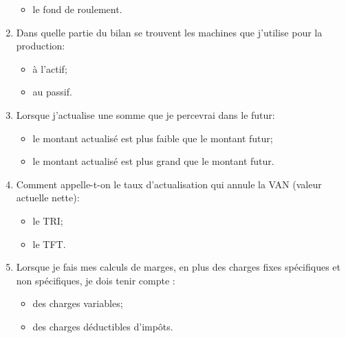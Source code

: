 \begin{enumerate}
\begin{itemize}
     \item le fond de roulement.
    \end{itemize}
  \item Dans quelle partie du bilan se trouvent les machines que j'utilise pour la production:
    \begin{itemize}
     \item à l'actif;
     \item au passif.
    \end{itemize}
  \item Lorsque j'actualise une somme que je percevrai dans le futur:
    \begin{itemize}
     \item le montant actualisé est plus faible que le montant futur;
     \item le montant actualisé est plus grand que le montant futur.
    \end{itemize}
  \item Comment appelle-t-on le taux d'actualisation qui annule la VAN (valeur actuelle nette):
    \begin{itemize}
     \item le TRI;
     \item le TFT.
    \end{itemize}
  \item Lorsque je fais mes calculs de marges, en plus des charges fixes spécifiques et non spécifiques, je dois tenir compte  :
    \begin{itemize}
     \item des charges variables;
     \item des charges déductibles d'impôts.
    \end{itemize}
\end{enumerate}

\endgroup